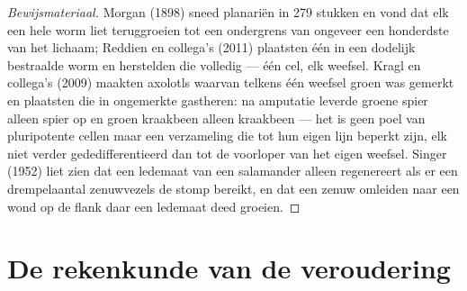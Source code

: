 \begin{proof}[Bewijsmateriaal]
Morgan (1898) sneed planariën in 279 stukken en vond dat elk een hele
worm liet teruggroeien tot een ondergrens van ongeveer een honderdste
van het lichaam; Reddien en collega's (2011) plaatsten één  in
een dodelijk bestraalde worm en herstelden die volledig --- één cel,
elk weefsel. Kragl en collega's (2009) maakten axolotls waarvan telkens
één weefsel groen was gemerkt en plaatsten die in ongemerkte
gastheren: na amputatie leverde groene spier alleen spier op en groen
kraakbeen alleen kraakbeen --- het  is geen poel van
pluripotente cellen maar een verzameling  die tot hun
eigen lijn beperkt zijn, elk niet verder gededifferentieerd dan tot de
voorloper van het eigen weefsel. Singer (1952) liet zien dat een
ledemaat van een salamander alleen regenereert als er een drempelaantal
zenuwvezels de stomp bereikt, en dat een zenuw omleiden naar een wond
op de flank daar een ledemaat deed groeien.
\end{proof}

\section{De rekenkunde van de veroudering}

